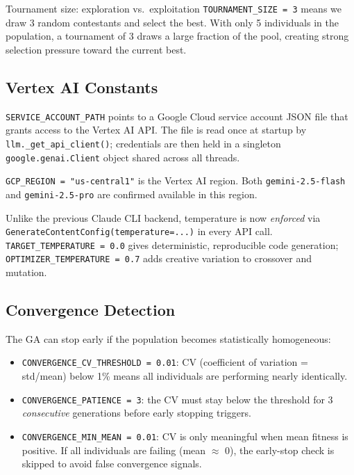 \documentclass[11pt,a4paper]{report}
\newcommand{\fn}[1]{\texttt{#1}}
\begin{document}
\begin{conceptbox}{Tournament size: exploration vs.\ exploitation}
\fn{TOURNAMENT\_SIZE = 3} means we draw 3 random contestants and select the best.
With only 5 individuals in the population, a tournament of 3 draws a large fraction
of the pool, creating strong selection pressure toward the current best.
\end{conceptbox}

\subsection{Vertex AI Constants}

\fn{SERVICE\_ACCOUNT\_PATH} points to a Google Cloud service account JSON file that grants
access to the Vertex AI API.  The file is read once at startup by \fn{llm.\_get\_api\_client()};
credentials are then held in a singleton \fn{google.genai.Client} object shared across all threads.

\fn{GCP\_REGION = "us-central1"} is the Vertex AI region.  Both \fn{gemini-2.5-flash} and
\fn{gemini-2.5-pro} are confirmed available in this region.

Unlike the previous Claude CLI backend, temperature is now \emph{enforced} via
\fn{GenerateContentConfig(temperature=...)} in every API call.  \fn{TARGET\_TEMPERATURE = 0.0}
gives deterministic, reproducible code generation; \fn{OPTIMIZER\_TEMPERATURE = 0.7} adds
creative variation to crossover and mutation.

\subsection{Convergence Detection}

The GA can stop early if the population becomes statistically homogeneous:

\begin{itemize}[nosep]
  \item \fn{CONVERGENCE\_CV\_THRESHOLD = 0.01}: CV (coefficient of variation = std/mean)
    below 1\% means all individuals are performing nearly identically.
  \item \fn{CONVERGENCE\_PATIENCE = 3}: the CV must stay below the threshold for 3
    \emph{consecutive} generations before early stopping triggers.
  \item \fn{CONVERGENCE\_MIN\_MEAN = 0.01}: CV is only meaningful when mean fitness is
    positive.  If all individuals are failing (mean $\approx$ 0), the early-stop check
    is skipped to avoid false convergence signals.
\end{itemize}
\end{document}
